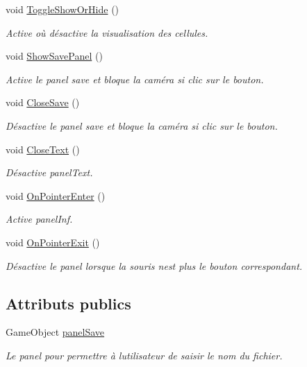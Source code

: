 \begin{DoxyCompactItemize}
void \mbox{\hyperlink{class_menu_visualization_u_i_acc1ed888dd19359811e473ffbd2fa86a}{Toggle\+Show\+Or\+Hide}} ()
\begin{DoxyCompactList}\small\item\em Active où désactive la visualisation des cellules. \end{DoxyCompactList}\item 
void \mbox{\hyperlink{class_menu_visualization_u_i_aabfef8a72ef59e04916f6d95a1274431}{Show\+Save\+Panel}} ()
\begin{DoxyCompactList}\small\item\em Active le panel save et bloque la caméra si clic sur le bouton. \end{DoxyCompactList}\item 
void \mbox{\hyperlink{class_menu_visualization_u_i_a262b9857eed5d1a7e749beb653a88cad}{Close\+Save}} ()
\begin{DoxyCompactList}\small\item\em Désactive le panel save et bloque la caméra si clic sur le bouton. \end{DoxyCompactList}\item 
void \mbox{\hyperlink{class_menu_visualization_u_i_a5f689cefeb05b7bfdc19c56179deb6ef}{Close\+Text}} ()
\begin{DoxyCompactList}\small\item\em Désactive panel\+Text. \end{DoxyCompactList}\item 
void \mbox{\hyperlink{class_menu_visualization_u_i_aeb3cdd54092efba28c3a0c693dd64040}{On\+Pointer\+Enter}} ()
\begin{DoxyCompactList}\small\item\em Active panel\+Inf. \end{DoxyCompactList}\item 
void \mbox{\hyperlink{class_menu_visualization_u_i_a6ebf2452335526b9d63b69ce420d2365}{On\+Pointer\+Exit}} ()
\begin{DoxyCompactList}\small\item\em Désactive le panel lorsque la souris n\textquotesingle{}est plus le bouton correspondant. \end{DoxyCompactList}\end{DoxyCompactItemize}
\subsection*{Attributs publics}
\begin{DoxyCompactItemize}
\item 
Game\+Object \mbox{\hyperlink{class_menu_visualization_u_i_af538de452b7ce9bd31c5b61a3c3d0886}{panel\+Save}}
\begin{DoxyCompactList}\small\item\em Le panel pour permettre à l\textquotesingle{}utilisateur de saisir le nom du fichier. \end{DoxyCompactList}\end{DoxyCompactItemize}
